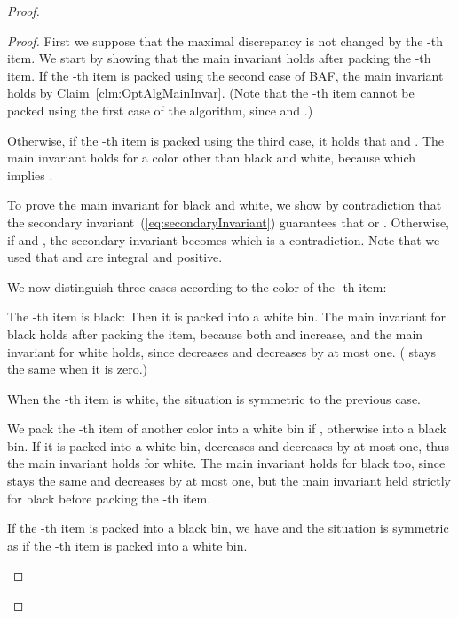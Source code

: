 \documentclass[11pt,a4paper]{article}
\begin{document}
\begin{proof}
\begin{proof}
First we suppose that the maximal discrepancy  is not changed by the -th item.
We start by showing that the main invariant holds after packing the -th item.
If the -th item is packed using the second case of BAF,
the main invariant holds by Claim~\ref{clm:OptAlgMainInvar}.
(Note that the -th item cannot be packed using the first case of the algorithm,
since  and .)

Otherwise, if the -th item is packed using the third case,
it holds that  and .
The main invariant holds for a color  other than black and white,
because  which implies .

To prove the main invariant for black and white,
we show by contradiction that the secondary invariant~(\ref{eq:secondaryInvariant})
guarantees that
 or .
Otherwise, if  and
, the secondary invariant becomes
 which is a contradiction.
Note that we used that  and 
are integral and positive.

We now distinguish three cases according to the color of the -th item:
\begin{compactitem}
\item The -th item is black: Then it is packed into a white bin.
The main invariant for black holds after packing the item, because
both  and  increase, 
and the main invariant for white holds, since
 decreases and  decreases by at most one.
( stays the same when it is zero.)
\item When the -th item is white, the situation is symmetric to the previous case.
\item We pack the -th item of another color into a white bin if
,
otherwise into a black bin. 
If it is packed into a white bin,  decreases and  decreases by at most one,
thus the main invariant holds for white.
The main invariant holds for black too, since  stays the same
and  decreases by at most one, but the main invariant held strictly for black
before packing the -th item.

If the -th item is packed into a black bin,
we have 
and the situation is symmetric as if the -th item is packed into a white bin.
\end{compactitem}


\end{proof}
\end{proof}
\end{document}
